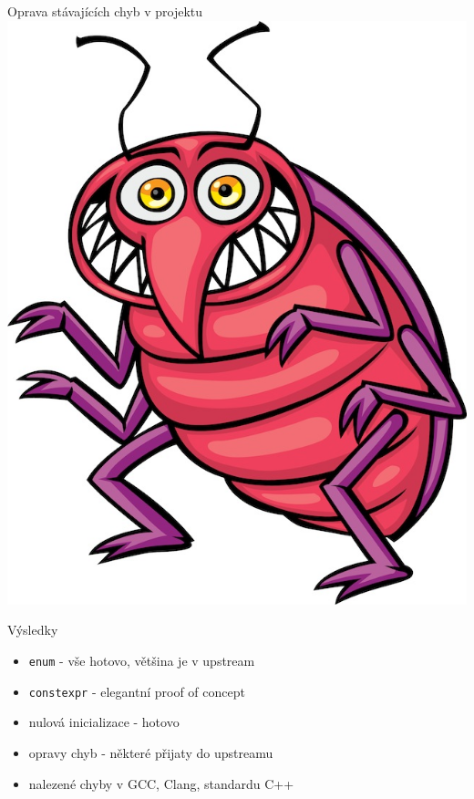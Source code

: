 \documentclass[11pt]{beamer}
\begin{document}


\begin{frame}{Oprava stávajících chyb v projektu}
\includegraphics[width=0.5\linewidth]{img/bug.jpg}
\end{frame}


\begin{frame}{Výsledky}
\begin{itemize}
\pause \item \texttt{enum} - vše hotovo, většina je v upstream
\pause \item \texttt{constexpr} - elegantní proof of concept
\pause \item nulová inicializace - hotovo
\pause \item opravy chyb - některé přijaty do upstreamu
\pause \item nalezené chyby v GCC, Clang, standardu C++
\end{itemize}
\end{frame}
\end{document}
